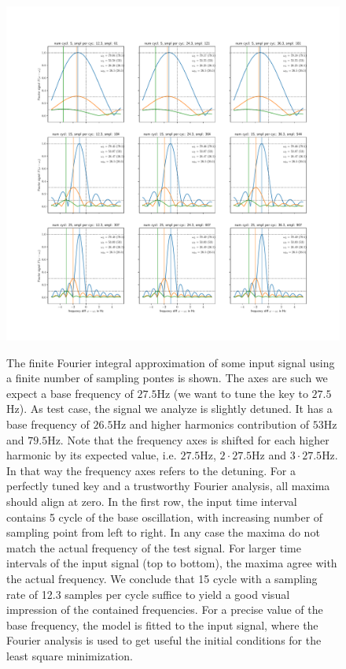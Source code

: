 \documentclass[10pt]{scrartcl}
\begin{document}
\begin{figure}[htb]
\includegraphics[width=\textwidth]{freq_recov}
\label{fig:freq_recov}
\caption{
The finite Fourier integral approximation of some input signal using a finite number of sampling pontes is shown.
The axes are such we expect a base frequency of $27.5$Hz (we want to tune the key to $27.5$Hz).
As test case, the signal we analyze is slightly detuned.
It has a base frequency of $26.5$Hz and higher harmonics contribution of $53$Hz and $79.5$Hz.
Note that the frequency axes is shifted for each higher harmonic by its expected value, i.e. $27.5$Hz, $2\cdot27.5$Hz and $3\cdot27.5$Hz.
In that way the frequency axes refers to the detuning.
For a perfectly tuned key and a trustworthy Fourier analysis, all maxima should align at zero.
In the first row, the input time interval contains 5 cycle of the base oscillation, with increasing number of sampling point from left to right.
In any case the maxima do not match the actual frequency of the test signal.
For larger time intervals of the input signal (top to bottom), the maxima agree with the actual frequency.
We conclude that 15 cycle with a sampling rate of 12.3 samples per cycle suffice to yield a good visual impression of the contained frequencies.
For a precise value of the base frequency, the model is fitted to the input signal, where the Fourier analysis is used to get useful the initial conditions for the least square minimization.
}
\end{figure}
\end{document}
